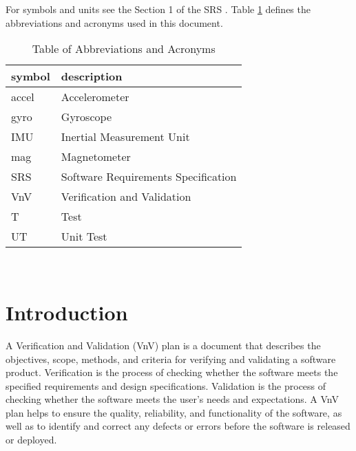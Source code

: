 \documentclass[12pt, titlepage]{article}
\begin{document}
For symbols and units see the Section 1 of the SRS \citep{SRS}. Table \ref{tab:abb} defines the
abbreviations and acronyms used in this document.


\begin{table}[!h]
  \centering
  \caption{Table of Abbreviations and Acronyms}
\renewcommand{\arraystretch}{1.2}
\begin{tabular}{l l}
    \toprule
    \textbf{symbol} & \textbf{description}\\
    \midrule
    accel & Accelerometer \\
    gyro & Gyroscope \\
    IMU & Inertial Measurement Unit\\
    mag & Magnetometer \\
    SRS & Software Requirements Specification\\
    VnV & Verification and Validation \\
    T & Test\\
    UT & Unit Test \\
    \bottomrule
\end{tabular}\\
\label{tab:abb}
\end{table}



\newpage


\section{Introduction}

A Verification and Validation (VnV) plan is a document that describes the objectives, scope,
methods, and criteria for verifying and validating a software product. Verification is the process
of checking whether the software meets the specified requirements and design specifications.
Validation is the process of checking whether the software meets the user's needs and expectations.
A VnV plan helps to ensure the quality, reliability, and functionality of the software, as well as
to identify and correct any defects or errors before the software is released or deployed.
\end{document}
